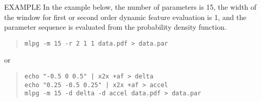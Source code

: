 \begin{qsection}{EXAMPLE}
	In the example below,
        the number of parameters is 15, the width of
        the window for first or second order dynamic feature
        evaluation is 1, and the parameter sequence is
        evaluated from the probability density function.
 \begin{quote}
	\verb!mlpg -m 15 -r 2 1 1 data.pdf > data.par!
 \end{quote}
	or
 \begin{quote}
	\verb!echo "-0.5 0 0.5" | x2x +af > delta! \\
	\verb!echo "0.25 -0.5 0.25" | x2x +af > accel! \\
	\verb!mlpg -m 15 -d delta -d accel data.pdf > data.par!
 \end{quote}
\end{qsection}

